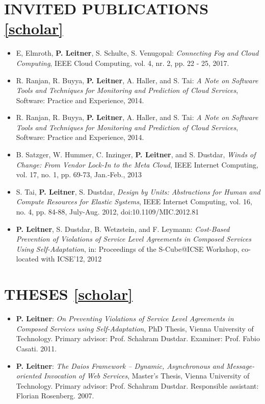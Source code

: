 \documentclass[paper=letter,fontsize=11pt]{scrartcl} %
\newcommand{\NewPart}[2]{\section*{\uppercase{#1} #2}}
\begin{document}
\NewPart{Invited Publications}{\href{https://scholar.google.ch/citations?user=wZ9f8CAAAAAJ}{[scholar]}}

\begin{itemize}
	\item E, Elmroth, \textbf{P. Leitner}, S. Schulte, S. Venugopal:
  \emph{Connecting Fog and Cloud Computing}, IEEE Cloud Computing, vol. 4, nr. 2, pp. 22 - 25, 2017.
	\item R. Ranjan, R. Buyya, \textbf{P. Leitner}, A. Haller, and S. Tai:
  \emph{A Note on Software Tools and Techniques for Monitoring and Prediction of Cloud Services}, Software: Practice and Experience, 2014.
  \item R. Ranjan, R. Buyya, \textbf{P. Leitner}, A. Haller, and S. Tai:
  \emph{A Note on Software Tools and Techniques for Monitoring and Prediction of Cloud Services}, Software: Practice and Experience, 2014.
  \item B. Satzger, W. Hummer, C. Inzinger, \textbf{P. Leitner}, and S. Dustdar, \emph{Winds of Change: From Vendor Lock-In to the Meta Cloud}, IEEE Internet Computing, vol. 17, no. 1, pp. 69-73, Jan.-Feb., 2013
  \item S. Tai, \textbf{P. Leitner}, S. Dustdar, \emph{Design by Units: Abstractions for Human and Compute Resources for Elastic Systems}, IEEE Internet Computing, vol. 16, no. 4, pp. 84-88, July-Aug. 2012, doi:10.1109/MIC.2012.81
  \item \textbf{P. Leitner}, S. Dustdar, B. Wetzstein, and F.
  Leymann: \emph{Cost-Based Prevention of Violations of Service Level Agreements
  in Composed Services Using Self-Adaptation}, in: Proceedings of the S-Cube@ICSE Workshop, co-located with ICSE'12, 2012
\end{itemize}

\NewPart{Theses}{\href{https://scholar.google.ch/citations?user=wZ9f8CAAAAAJ}{[scholar]}}

\begin{itemize}
  \item \textbf{P. Leitner}: \emph{On Preventing Violations of Service Level
  Agreements in Composed Services using Self-Adaptation},  PhD Thesis, Vienna
  University of Technology. Primary advisor: Prof. Schahram Dustdar. Examiner:
  Prof. Fabio Casati. 2011.
  \item \textbf{P. Leitner}: \emph{The Daios Framework -- Dynamic, Asynchronous
  and Message-oriented Invocation of Web Services},  Master's Thesis, Vienna
  University of Technology. Primary advisor: Prof. Schahram Dustdar. Responsible
  assistant: Florian Rosenberg. 2007.
\end{itemize}
\end{document}
